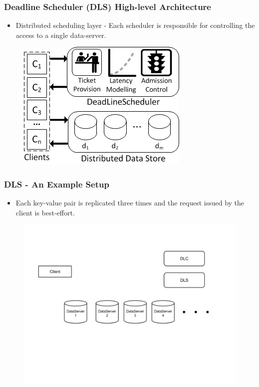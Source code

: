 \documentclass{beamer}
\begin{document}
\begin{frame}
  \frametitle{Deadline Scheduler (DLS) High-level Architecture}
  \begin{itemize}
  \item Distributed scheduling layer - Each scheduler is responsible for
    controlling the access to a single data-server.
  \end{itemize}
  \begin{figure}
    \begin{center}
      \centerline{\includegraphics[scale=0.90]{img/DLS.png}}
    \end{center}
  \end{figure}
\end{frame}

\begin{frame}
  \frametitle{DLS - An Example Setup}
  \begin{itemize}
    \item Each key-value pair is replicated three times and the request issued
      by the client is best-effort.
  \end{itemize}
  \begin{figure}
    \begin{center}
      \centerline{\includegraphics[scale=0.40]{img/DLS_Example1.png}}
    \end{center}
  \end{figure}
\end{frame}
\end{document}
